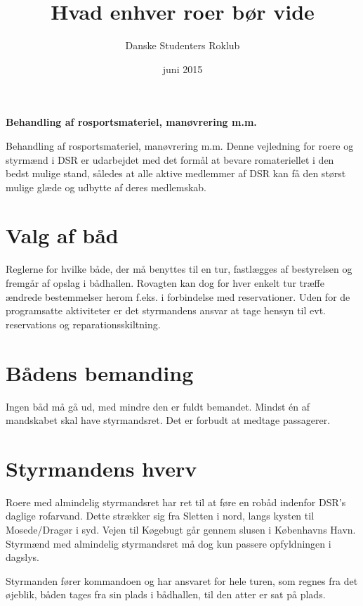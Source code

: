\documentclass{article}
\title{Hvad enhver roer bør vide}
\author{Danske Studenters Roklub}
\date{juni 2015}
\begin{document}
    \maketitle
    \begin{center}
        \textbf{Behandling af rosportsmateriel, manøvrering m.m.}
    \end{center}

    Behandling af rosportsmateriel, manøvrering m.m. Denne vejledning for
    roere og styrmænd i DSR er udarbejdet med det formål at bevare
    romateriellet i den bedst mulige stand, således at alle aktive
    medlemmer af DSR kan få den størst mulige glæde og udbytte af deres
    medlemskab.

    \tableofcontents

    \section{Valg af båd}%

     Reglerne for hvilke både, der må benyttes til en tur, fastlægges af
     bestyrelsen og fremgår af opslag i bådhallen. Rovagten kan dog for
     hver enkelt tur træffe ændrede bestemmelser herom f.eks. i
     forbindelse med reservationer. Uden for de programsatte aktiviteter
     er det styrmandens ansvar at tage hensyn til evt.  reservations og
     reparationsskiltning.

\section{Bådens bemanding}

Ingen båd må gå ud, med mindre den er fuldt bemandet. Mindst én af
mandskabet skal have styrmandsret.  Det er forbudt at medtage passagerer.

\section{Styrmandens hverv}

Roere med almindelig styrmandsret har ret til at føre en robåd indenfor
DSR's daglige rofarvand. Dette strækker sig fra Sletten i nord, langs
kysten til Mosede/Dragør i syd. Vejen til Køgebugt går gennem slusen i
Københavns Havn.  Styrmænd med almindelig styrmandsret må dog kun passere
opfyldningen i dagslys.

Styrmanden fører kommandoen og har ansvaret for hele turen, som regnes
fra det øjeblik, båden tages fra sin plads i bådhallen, til den atter er
sat på plads.
\end{document}
